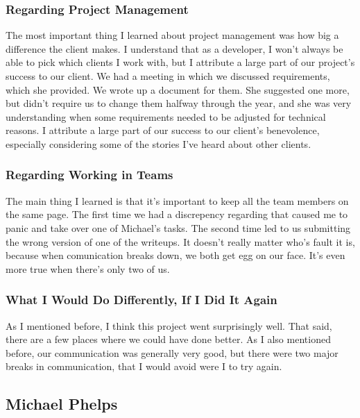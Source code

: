 \documentclass[letterpaper,10pt, onecolumn, draftclsnofoot]{IEEEtran}
\begin{document}
\subsubsection{Regarding Project Management}
The most important thing I learned about project management was how big a difference the client makes. I understand that as a developer, I won't always be able to pick which clients I work with, but I attribute a large part of our project's success to our client. We had a meeting in which we discussed requirements, which she provided. We wrote up a document for them. She suggested one more, but didn't require us to change them halfway through the year, and she was very understanding when some requirements needed to be adjusted for technical reasons. I attribute a large part of our success to our client's benevolence, especially considering some of the stories I've heard about other clients.

\subsubsection{Regarding Working in Teams}
The main thing I learned is that it's important to keep all the team members on the same page. The first time we had a discrepency regarding that caused me to panic and take over one of Michael's tasks. The second time led to us submitting the wrong version of one of the writeups. It doesn't really matter who's fault it is, because when comunication breaks down, we both get egg on our face. It's even more true when there's only two of us.

\subsubsection{What I Would Do Differently, If I Did It Again}
As I mentioned before, I think this project went surprisingly well. That said, there are a few places where we could have done better. As I also mentioned before, our communication was generally very good, but there were two major breaks in communication, that I would avoid were I to try again.

\subsection{Michael Phelps}


\end{document}
